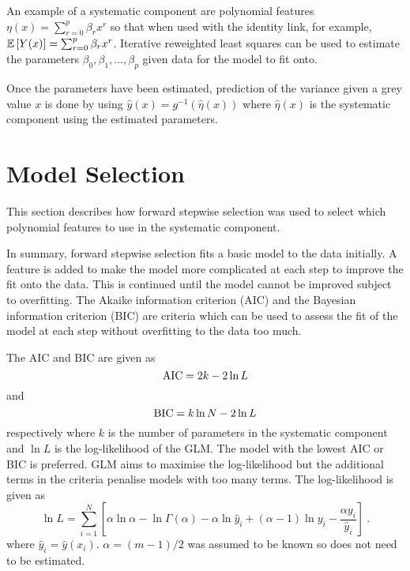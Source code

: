 An example of a systematic component are polynomial features $\eta(x)=\sum_{r=0}^{p}\beta_r x^{r}$ so that when used with the identity link, for example, $\operatorname{\mathbb{E}}\left[Y(x)\right] = \sum_{r=0}^{p}\beta_r x^{r}$. Iterative reweighted least squares \citep{friedman2001elements} can be used to estimate the parameters $\beta_0, \beta_1, \dotsc, \beta_{p}$ given data for the model to fit onto.

Once the parameters have been estimated, prediction of the variance given a grey value $x$ is done by using $\widehat{y}(x) = g^{-1}(\widehat{\eta}(x))$ where $\widehat{\eta}(x)$ is the systematic component using the estimated parameters.

\section{Model Selection}

This section describes how forward stepwise selection \citep{efroymson1960multiple, friedman2001elements} was used to select which polynomial features to use in the systematic component.

In summary, forward stepwise selection fits a basic model to the data initially. A feature is added to make the model more complicated at each step to improve the fit onto the data. This is continued until the model cannot be improved subject to overfitting. The Akaike information criterion (AIC) \citep{akaike1974new, friedman2001elements} and the Bayesian information criterion (BIC) \citep{schwarz1978estimating, friedman2001elements} are criteria which can be used to assess the fit of the model at each step without overfitting to the data too much.

The AIC and BIC are given as
\begin{equation}
\mathrm{AIC} = 2k-2\ln L
\end{equation}
and
\begin{equation}
\mathrm{BIC} = k\ln N - 2\ln L
\end{equation}
respectively where $k$ is the number of parameters in the systematic component and $\ln L$ is the log-likelihood of the GLM. The model with the lowest AIC or BIC is preferred. GLM aims to maximise the log-likelihood but the additional terms in the criteria penalise models with too many terms. The log-likelihood is given as
\begin{equation}
  \ln L = \sum_{i=1}^N \left[
    \alpha\ln\alpha
    -\ln\Gamma(\alpha)
    -\alpha\ln \widehat{y}_i
    +(\alpha-1)\ln y_i
    -\frac{\alpha y_i}{\widehat{y}_i}
  \right]
  \ .
\end{equation}
where $\widehat{y}_i=\widehat{y}(x_i)$. $\alpha=(m-1)/2$ was assumed to be known so does not need to be estimated.


